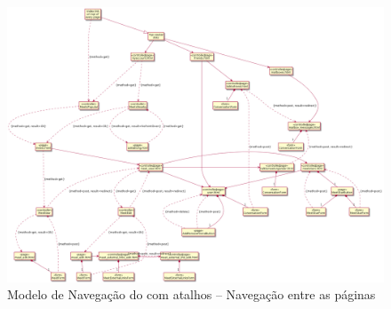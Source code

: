 \begin{figure}[H]
	\centering
	\includegraphics[scale=0.25]{figuras/navigation-shortcut1_res2.png}
	\caption{Modelo de Navegação do \imprimirtitulo{} com atalhos -- Navegação entre as páginas}
	\label{fig:shortcut1:res2}
\end{figure}


%
%
%
%

